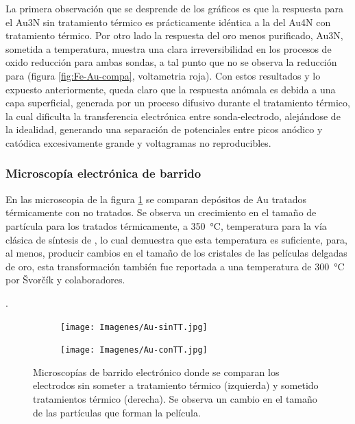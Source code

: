 {			La primera observación que se desprende de los gráficos es que la respuesta para el Au3N sin tratamiento térmico es prácticamente idéntica a la del Au4N con tratamiento térmico. Por otro lado la respuesta del oro menos purificado, Au3N, sometida a temperatura, muestra una clara irreversibilidad en los procesos de oxido reducción para ambas sondas, a tal punto que no se observa la reducción para \ferroferri\space (figura \ref{fig:Fe-Au-compa}, voltametria roja). Con estos resultados y lo expuesto anteriormente, queda claro que la respuesta anómala es debida a una capa superficial, generada por un proceso difusivo durante el tratamiento térmico, la cual dificulta la transferencia electrónica entre sonda-electrodo, alejándose de la idealidad, generando una separación de potenciales entre picos anódico y catódica excesivamente grande y voltagramas no reproducibles.
			

			
		\subsubsection{Microscopía electrónica de barrido}
			  		
			 En las microscopia de la figura \ref{fig:Au_compTT} se comparan depósitos de Au tratados térmicamente con no tratados. Se observa un crecimiento en el tamaño de partícula para los tratados térmicamente, a \SI{350}{\celsius}, temperatura para la vía clásica de síntesis de \pdm, lo cual demuestra que esta temperatura es suficiente, para, al menos, producir cambios en el tamaño de los cristales de las películas delgadas de oro, esta transformación también fue reportada a una temperatura de \SI{300}{\celsius} por \v{S}vor\v{c}\'ik y colaboradores.}\cite{Svorcik2010}.
			 		\begin{figure}[th]
		 	   	    \begin{subfigure}[t]{0.49\textwidth}
			       	\texttt{[image: Imagenes/Au-sinTT.jpg]}
			   		\end{subfigure}
			   		\begin{subfigure}[t]{0.49\textwidth}
			   	    \texttt{[image: Imagenes/Au-conTT.jpg]}
			   		\end{subfigure}
					 \caption[Microscopía comparativa electrodos Au]{Microscopías de barrido electrónico donde se comparan los electrodos sin someter a tratamiento térmico (izquierda) y sometido tratamientos térmico (derecha). Se observa un cambio en el tamaño de las partículas que forman la película.}
					 \label{fig:Au_compTT}	
				     \end{figure}
		 		 		
